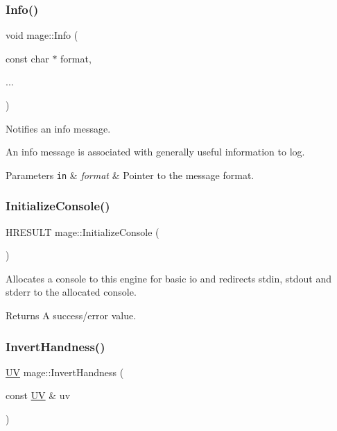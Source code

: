 \subsubsection{\texorpdfstring{Info()}{Info()}}
{\footnotesize\ttfamily void mage\+::\+Info (\begin{DoxyParamCaption}\item[{const char $\ast$}]{format,  }\item[{}]{... }\end{DoxyParamCaption})}

Notifies an info message.

An info message is associated with generally useful information to log.


\begin{DoxyParams}[1]{Parameters}
\mbox{\tt in}  & {\em format} & Pointer to the message format. \\
\hline
\end{DoxyParams}
\hypertarget{namespacemage_a14798232aabfdf96d751f4fcca4e6ece}{}\label{namespacemage_a14798232aabfdf96d751f4fcca4e6ece} 
\subsubsection{\texorpdfstring{Initialize\+Console()}{InitializeConsole()}}
{\footnotesize\ttfamily H\+R\+E\+S\+U\+LT mage\+::\+Initialize\+Console (\begin{DoxyParamCaption}{ }\end{DoxyParamCaption})}

Allocates a console to this engine for basic io and redirects stdin, stdout and stderr to the allocated console.

\begin{DoxyReturn}{Returns}
A success/error value. 
\end{DoxyReturn}
\hypertarget{namespacemage_a13b912f3dcd9c202fe3f9edb424e3b78}{}\label{namespacemage_a13b912f3dcd9c202fe3f9edb424e3b78} 
\subsubsection{\texorpdfstring{Invert\+Handness()}{InvertHandness()}\hspace{0.1cm}{\footnotesize\ttfamily [1/4]}}
{\footnotesize\ttfamily \hyperlink{structmage_1_1_u_v}{UV} mage\+::\+Invert\+Handness (\begin{DoxyParamCaption}\item[{const \hyperlink{structmage_1_1_u_v}{UV} \&}]{uv }\end{DoxyParamCaption})}

